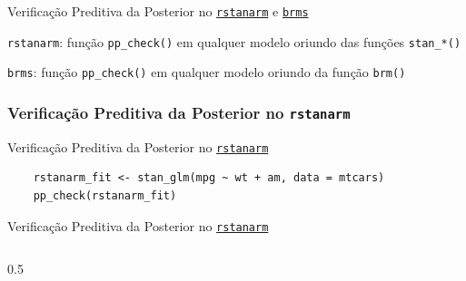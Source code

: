 \begin{frame}{Verificação Preditiva da Posterior no \href{http://mc-stan.org/rstanarm/}{\texttt{rstanarm}} e \href{https://paul-buerkner.github.io/brms/}{\texttt{brms}}}
    \begin{vfilleditems}
        \item \texttt{rstanarm}: função \lstinline!pp_check()! em qualquer modelo oriundo das funções \lstinline!stan_*()!
        \item \texttt{brms}: função \lstinline!pp_check()! em qualquer modelo oriundo da função \lstinline!brm()!
    \end{vfilleditems}
\end{frame}

\subsubsection{Verificação Preditiva da Posterior no \texttt{rstanarm}}
\begin{frame}[fragile]{Verificação Preditiva da Posterior no \href{http://mc-stan.org/rstanarm/}{\texttt{rstanarm}}}
    \begin{lstlisting}
    rstanarm_fit <- stan_glm(mpg ~ wt + am, data = mtcars)
    pp_check(rstanarm_fit)
    \end{lstlisting}
\end{frame}

\begin{frame}{Verificação Preditiva da Posterior no \href{http://mc-stan.org/rstanarm/}{\texttt{rstanarm}}}
    \begin{columns}
        \begin{column}{0.5\textwidth}
            \begin{figure}
                \centering
                \resizebox{0.8\columnwidth}{!}{}
            \end{figure}
        \end{column}
    \end{columns}
\end{frame}

